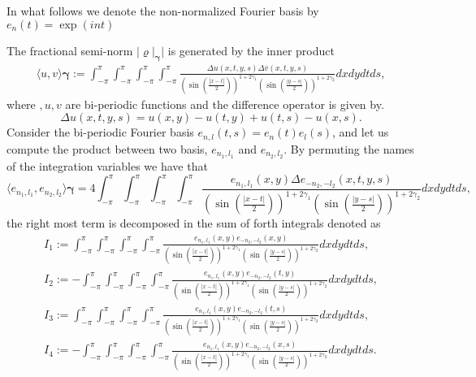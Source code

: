 \documentclass{article}
\begin{document}
In what follows we denote the non-normalized Fourier basis by $e_n(t) = \exp{(i n t) }$

The fractional semi-norm $|\varrho|_{\mathbf{\gamma}}|$ is generated by the inner product 
\begin{align*}
\langle u , v \rangle{\mathbf{\gamma}} := \int_{-\pi}^{\pi}  \int_{-\pi}^{\pi} \int_{-\pi}^{\pi}\int_{-\pi}^{\pi} \frac{\Delta u (x,t,y,s)\Delta \overline{v} (x,t,y,s) }
{\left(\sin\left(\frac{|x-t|}{2}\right)\right)^{1+2\gamma_1}\left(\sin\left(\frac{|y-s|}{2}\right)\right)^{1+2\gamma_2}}dx dy dt ds, 
\end{align*}
where $,u,v$ are bi-periodic functions and the difference operator is given by.
$$\Delta u(x,t,y,s) = u(x,y)-u(t,y)+u(t,s)-u(x,s).$$
Consider the bi-periodic Fourier basis 
$e_{n,l}(t,s) = e_n(t)e_l(s)$, and let us compute the product between two basis, $e_{n_1,l_1}$ and $e_{n_2,l_2}$.  By permuting the names of the integration variables we have that 
$$\langle e_{n_1,l_1} , e_{n_2,l_2} \rangle{\mathbf{\gamma}}  =
4 \int_{-\pi}^{\pi}  \int_{-\pi}^{\pi} \int_{-\pi}^{\pi}\int_{-\pi}^{\pi} \frac{e_{n_1,l_1}(x,y)\Delta e_{-n_2,-l_2} (x,t,y,s) }
{\left(\sin\left(\frac{|x-t|}{2}\right)\right)^{1+2\gamma_1}\left(\sin\left(\frac{|y-s|}{2}\right)\right)^{1+2\gamma_2}}dx dy dt ds, 
$$
the right most term is decomposed in the sum of forth integrals denoted as
\begin{align*}
I_1 := \int_{-\pi}^{\pi}\int_{-\pi}^{\pi} \int_{-\pi}^{\pi}\int_{-\pi}^{\pi} \frac{e_{n_1,l_1}(x,y)e_{-n_2,-l_2} (x,y) }
{\left(\sin\left(\frac{|x-t|}{2}\right)\right)^{1+2\gamma_1}\left(\sin\left(\frac{|y-s|}{2}\right)\right)^{1+2\gamma_2}}dx dy dt ds,\\
I_2 :=  -\int_{-\pi}^{\pi}\int_{-\pi}^{\pi} \int_{-\pi}^{\pi}\int_{-\pi}^{\pi} \frac{e_{n_1,l_1}(x,y)e_{-n_2,-l_2} (t,y) }
{\left(\sin\left(\frac{|x-t|}{2}\right)\right)^{1+2\gamma_1}\left(\sin\left(\frac{|y-s|}{2}\right)\right)^{1+2\gamma_2}}dx dy dt ds,\\
I_3 := \int_{-\pi}^{\pi}\int_{-\pi}^{\pi} \int_{-\pi}^{\pi}\int_{-\pi}^{\pi} \frac{e_{n_1,l_1}(x,y)e_{-n_2,-l_2} (t,s) }
{\left(\sin\left(\frac{|x-t|}{2}\right)\right)^{1+2\gamma_1}\left(\sin\left(\frac{|y-s|}{2}\right)\right)^{1+2\gamma_2}}dx dy dt ds,\\
I_4 := -\int_{-\pi}^{\pi}\int_{-\pi}^{\pi} \int_{-\pi}^{\pi}\int_{-\pi}^{\pi} \frac{e_{n_1,l_1}(x,y)e_{-n_2,-l_2} (x,s) }
{\left(\sin\left(\frac{|x-t|}{2}\right)\right)^{1+2\gamma_1}\left(\sin\left(\frac{|y-s|}{2}\right)\right)^{1+2\gamma_2}}dx dy dt ds.
\end{align*}
\end{document}
